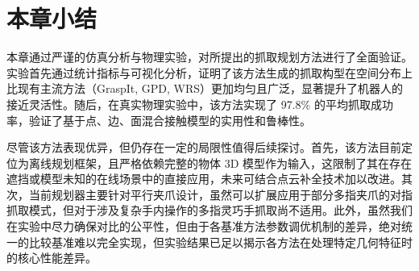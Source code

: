\section{本章小结}
\label{sec:summary}

本章通过严谨的仿真分析与物理实验，对所提出的抓取规划方法进行了全面验证。实验首先通过统计指标与可视化分析，证明了该方法生成的抓取构型在空间分布上比现有主流方法（GraspIt, GPD, WRS）更加均匀且广泛，显著提升了机器人的接近灵活性。随后，在真实物理实验中，该方法实现了 97.8\% 的平均抓取成功率，验证了基于点、边、面混合接触模型的实用性和鲁棒性。

尽管该方法表现优异，但仍存在一定的局限性值得后续探讨。首先，该方法目前定位为离线规划框架，且严格依赖完整的物体 3D 模型作为输入，这限制了其在存在遮挡或模型未知的在线场景中的直接应用，未来可结合点云补全技术加以改进。其次，当前规划器主要针对平行夹爪设计，虽然可以扩展应用于部分多指夹爪的对指抓取模式，但对于涉及复杂手内操作的多指灵巧手抓取尚不适用。此外，虽然我们在实验中尽力确保对比的公平性，但由于各基准方法参数调优机制的差异，绝对统一的比较基准难以完全实现，但实验结果已足以揭示各方法在处理特定几何特征时的核心性能差异。